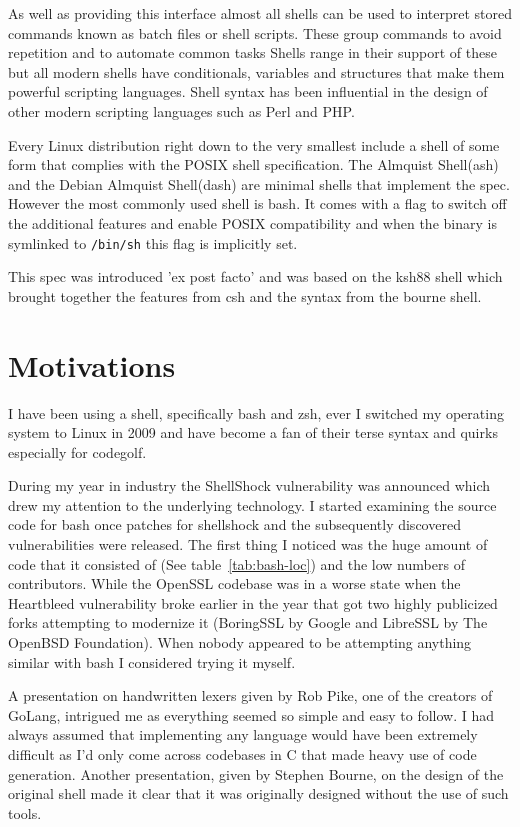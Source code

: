 As well as providing this interface almost all shells can be used to interpret stored commands known as batch files or shell scripts.
These group commands to avoid repetition and to automate common tasks
Shells range in their support of these but all modern shells have conditionals, variables and structures that make them powerful scripting languages.
Shell syntax has been influential in the design of other modern scripting languages such as Perl and PHP.

Every Linux distribution right down to the very smallest\cite{ALPINE-LINUX} include a shell of some form that complies with the POSIX shell specification\cite{POSIX-SHELL-STANDARD}. The Almquist Shell(ash) and the Debian Almquist Shell(dash) are minimal shells that implement the spec.
However the most commonly used shell is bash.
It comes with a flag to switch off the additional features and enable POSIX compatibility and when the binary is symlinked to \verb!/bin/sh! this flag is implicitly set.

This spec was introduced 'ex post facto' and was based on the ksh88 shell which  brought together the features from csh and the syntax from the bourne shell.  

\section{Motivations}
I have been using a shell, specifically bash and zsh, ever I switched my operating system to Linux in 2009 and have become a fan of their terse syntax and quirks especially for codegolf\cite{CODE-GOLF}.

During my year in industry the ShellShock\cite{SHELLSHOCK-CVE,SHELLSHOCK-LWN,SHELLSHOCK-SYMANTEC} vulnerability was announced which drew my attention to the underlying technology.
I started examining the source code for bash once patches for shellshock and the subsequently discovered vulnerabilities were released.
The first thing I noticed was the huge amount of code that it consisted of (See table~\ref{tab:bash-loc}) and the low numbers of contributors.
While the OpenSSL codebase was in a worse state when the Heartbleed vulnerability broke earlier in the year that got two highly publicized forks attempting to modernize it (BoringSSL by Google\cite{BORINGSSL} and LibreSSL by The OpenBSD Foundation\cite{LIBRESSL}).
When nobody appeared to be attempting anything similar with bash I considered trying it myself.

A presentation on handwritten lexers\cite{PIKE-LEXING-VIDEO} given by Rob Pike, one of the creators of GoLang, intrigued me as everything seemed so simple and easy to follow. 
I had always assumed that implementing any language would have been extremely difficult as I'd only come across codebases in C that made heavy use of code generation.
Another presentation, given by Stephen Bourne, on the design of the original shell\cite{DESIGN-OF-SH-VIDEO} made it clear that it was originally designed without the use of such tools.

